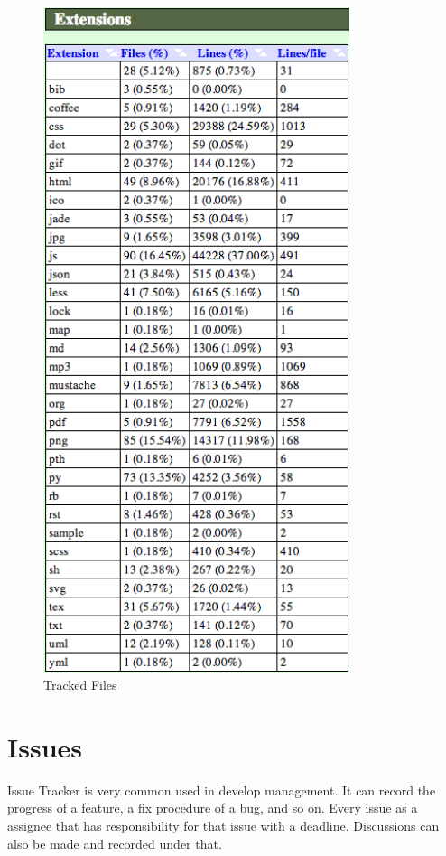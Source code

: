   \begin{figure}[H]
    \centering
    \includegraphics[width=0.8\textwidth]{figure/files.png}
    \caption{Tracked Files\label{fig:files}}
  \end{figure}
\section{Issues}
\label{sec:issue}
  Issue Tracker is very common used in develop management. It can record the progress of a feature, a fix procedure of a bug, and so on.
  Every issue as a assignee that has responsibility for that issue with a deadline. Discussions can also be made and recorded under that.

